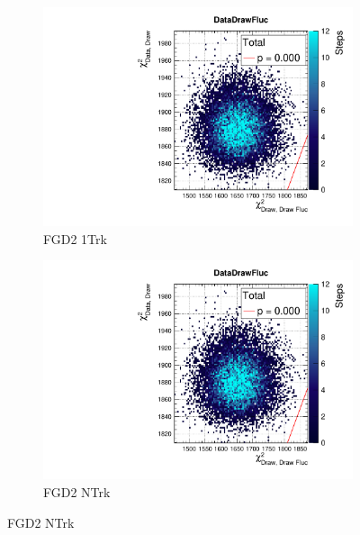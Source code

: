 \begin{figure}[h]
\begin{subfigure}[t]{0.24\textwidth}
	\includegraphics[width=\textwidth, trim={20mm 6mm 4mm 11mm}, clip,page=77]{figures/mach3/data/postpred/2017b_NewData_NewDet_UpdXsecStep_2Xsec_4Det_5Flux_0_PostPred_procs}
	\caption{FGD2 1Trk}
\end{subfigure}
\begin{subfigure}[t]{0.24\textwidth}
\includegraphics[width=\textwidth, trim={20mm 6mm 4mm 11mm}, clip,page=86]{figures/mach3/data/postpred/2017b_NewData_NewDet_UpdXsecStep_2Xsec_4Det_5Flux_0_PostPred_procs}
\caption{FGD2 NTrk}
\end{subfigure}


\end{figure}

